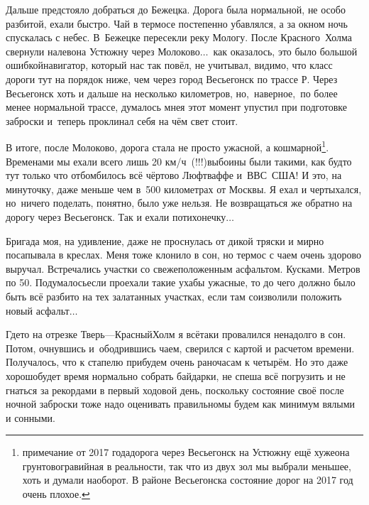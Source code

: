 Дальше предстояло добраться до Бежецка. Дорога была нормальной, не особо разбитой, ехали быстро. Чай в термосе постепенно убавлялся, а за окном ночь спускалась с небес. В~Бежецке пересекли реку Мологу. После Красного~Холма свернули налево\mdash на Устюжну через Молоково$\ldots$~как оказалось, это было большой ошибкой\mdash навигатор, который нас так повёл, не учитывал, видимо, что класс дороги тут на порядок ниже, чем через город Весьегонск по трассе Р. Через Весьегонск хоть и дальше на несколько километров, но,~наверное,~по более менее нормальной трассе, думалось мне\mdash я этот момент упустил при подготовке заброски и~теперь проклинал себя на чём свет стоит.


В итоге, после Молоково, дорога стала не просто ужасной, а кошмарной\footnote{примечание от 2017 года\mdash дорога через Весьегонск на Устюжну ещё хуже\mdash она грунтово\sdash гравийная в реальности, так что из двух зол мы выбрали меньшее, хоть и думали наоборот. В районе Весьегонска состояние дорог на 2017 год очень плохое.}. Временами мы ехали всего лишь 20\thinspace\nbdash{} км/ч~(!!!)\mdash выбоины были такими, как будто тут только что отбомбилось всё чёртово Люфтваффе и~ВВС~США! И это, на минуточку, даже меньше чем в~500 километрах от Москвы. Я ехал и чертыхался, но~ничего поделать, понятно, было уже нельзя. Не возвращаться же обратно на дорогу через Весьегонск. Так и ехали потихонечку$\ldots$ 

Бригада моя, на удивление, даже не проснулась от дикой тряски и мирно посапывала в креслах. Меня тоже клонило в сон, но термос с чаем очень здорово выручал. Встречались участки со свежеположенным асфальтом. Кусками. Метров по 50\thinspace\nbdash{}. Подумалось\mdash если проехали такие ухабы ужасные, то до чего должно было быть всё разбито на тех залатанных участках, если там соизволили положить новый асфальт$\ldots$ 
 
Где\sdash то на отрезке Тверь\thinspace\nobreakdash---\thinspace Красный\thinspace Холм я всё\sdash таки провалился ненадолго в сон. Потом, очнувшись и~ободрившись чаем, сверился с картой и расчетом времени. Получалось, что к стапелю прибудем очень рано\mdash часам к четырём. Но это даже хорошо\mdash будет время нормально собрать байдарки, не спеша всё погрузить и не гнаться за рекордами в первый ходовой день, поскольку состояние своё после ночной заброски тоже надо оценивать правильно\mdash мы будем как минимум вялыми и сонными. 

